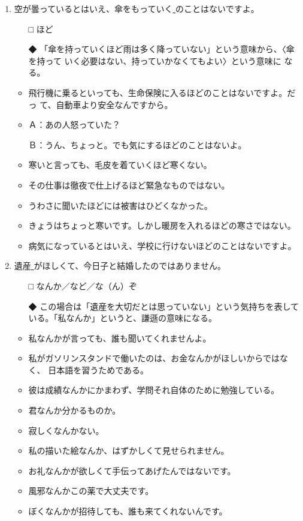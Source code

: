 \documentclass[
uplatex,
b5paper,
10pt,
dvipdfmx
]{jsbook}
\begin{document}
\begin{enumerate}
\item 空が曇っているとはいえ、傘をもっていく\underline{   }のことはないですよ。
\begin{itemize}
\item[□] ほど
\item[◆] 「傘を持っていくほど雨は多く降っていない」という意味から、〈傘
	  を持って いく必要はない、持っていかなくてもよい〉という意味に
	  なる。
\end{itemize}
\begin{itemize}
\item 飛行機に乗るといっても、生命保険に入るほどのことはないですよ。だっ
      て、自動車より安全なんですから。
\item Ａ：あの人怒っていた？

      Ｂ：うん、ちょ{}っと。でも気にするほどのことはないよ。

\item 寒いと言っても、毛皮を着ていくほど寒くない。
\item その仕事は徹夜で仕上げるほど緊急なものではない。
\item うわさに聞いたほどには被害はひどくなかった。
\item きょうはちょ{}っと寒いです。しかし暖房を入れるほどの寒さではない。
\item 病気になっているとはいえ、学校に行けないほどのことはないですよ。
\end{itemize}


\item 遺産\underline{    }がほしくて、今日子と結婚したのではありません。
\begin{itemize}
\item[□] なんか／など／な（ん）ぞ
\item[◆] この場合は「遺産を大切だとは思っていない」という気持ちを表して
	  いる。「私なんか」というと、謙遜の意味になる。
\end{itemize}
\begin{itemize}
\item 私なんかが言っても、誰も聞いてくれませんよ。
\item 私がガソリンスタンドで働いたのは、お金なんかがほしいからではなく、
      日本語を習うためである。
\item 彼は成績なんかにかまわず、学問それ自体のために勉強している。
\item 君なんか分かるものか。
\item 寂しくなんかない。
\item 私の描いた絵なんか、はずかしくて見せられません。
\item お礼なんかが欲しくて手伝ってあげたんではないです。
\item 風邪なんかこの薬で大丈夫です。
\item ぼくなんかが招待しても、誰も来てくれないんです。
\end{itemize}


\end{enumerate}
\end{document}
